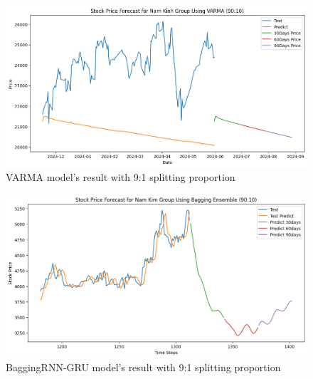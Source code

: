 \documentclass{ieeeojies}
\begin{document}
\begin{figure}[H]
  \centering
  \begin{minipage}{0.8\linewidth}
    \centering
    \includegraphics[width=\linewidth]{bibliography/VARMA_NKG_90-10.png}
    \caption{VARMA model's result with 9:1 splitting proportion}
    \label{fig24}
  \end{minipage}
\end{figure}
\begin{figure}[H]
  \centering
  \begin{minipage}{0.8\linewidth}
    \centering
    \includegraphics[width=\linewidth]{bibliography/Bagging_NKG.png}
    \caption{BaggingRNN-GRU model's result with 9:1 splitting proportion}
    \label{fig25}
  \end{minipage}
\end{figure}
\end{document}
